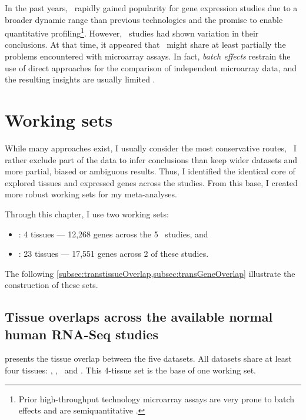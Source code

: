 In the past years,
\Rnaseq\ rapidly gained popularity
for gene expression studies
due to a broader dynamic range than previous technologies
and the promise to enable quantitative profiling\footnote{%
Prior high-throughput technology microarray assays are very prone
to batch effects and are semiquantitative .
}.
However, \Rnaseq\ studies had shown variation in their conclusions. 
At that time,
it appeared that
\Rnaseq\ might share at least partially the problems encountered
with microarray assays.
In fact, \emph{batch effects} restrain the use of direct approaches
for the comparison of independent microarray data,
and the resulting insights are usually limited .

\section{Working sets}

While many approaches exist,
I usually consider the most conservative routes,
\ie\ I rather exclude part of the data to infer conclusions than
keep wider datasets and more partial, biased or ambiguous results.
Thus, I identified the identical core of
explored tissues and expressed genes across the studies.
From this base, I created more robust working sets for my meta-analyses.

Through this chapter, I use two working sets:
\begin{itemize}[topsep=0pt,nosep]
    \item \setOne: 4 tissues --- 12,268 genes across the 5 \Rnaseq\ studies, and
    \item \setTwo: 23 tissues --- 17,551 genes across 2 of these studies.
\end{itemize}

The following \cref{subsec:transtissueOverlap,subsec:transGeneOverlap}
illustrate the construction of these sets.

\subsection{Tissue overlaps across the available normal human RNA-Seq studies \quad}%
\label{subsec:transtissueOverlap}
\vspace*{-5mm}
 presents the tissue overlap between the five datasets.
All datasets share at least four tissues:
\heart, \kidney, \liver\ and \testis.
This 4-tissue set is the base of one working set.

